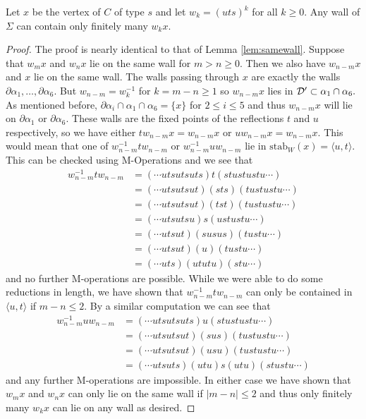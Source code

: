 \documentclass[class=book, crop=false]{standalone}
\begin{document}
\begin{lemma}
	\label{lem:336f2walls}
	Let $x$ be the vertex of $C$ of type $s$ and let $w_k=(uts)^k$ for all $k\ge 0.$ Any wall of $\Sigma$ can contain only finitely many $w_kx.$
\end{lemma}
\begin{proof}
	The proof is nearly identical to that of Lemma \ref{lem:samewall}. Suppose that $w_mx$ and $w_nx$ lie on the same wall for $m>n\ge 0.$ Then we also have $w_{n-m}x$ and $x$ lie on the same wall. The walls passing through $x$ are exactly the walls $\partial\alpha_1,\dots,\partial\alpha_6.$ But $w_{n-m}=w_k^{-1}$ for $k=m-n\ge 1$ so $w_{n-m}x$ lies in $\mathcal{D}'\subset \alpha_1\cap \alpha_6.$ As mentioned before, $\partial\alpha_i\cap \alpha_1\cap \alpha_6=\{x\}$ for $2\le i\le 5$ and thus $w_{n-m}x$ will lie on $\partial\alpha_1$ or $\partial\alpha_6.$ These walls are the fixed points of the reflections $t$ and $u$ respectively, so we have either $tw_{n-m}x=w_{n-m}x$ or $uw_{n-m}x=w_{n-m}x.$ This would mean that one of $w_{n-m}^{-1}tw_{n-m}$ or $w_{n-m}^{-1}uw_{n-m}$ lie in $\mathrm{stab}_W(x)=\langle u,t\rangle.$ This can be checked using M-Operations and we see that
	\begin{align*}
		w_{n-m}^{-1}tw_{n-m}&=(\cdots utsutsuts)t(stustustu\cdots)\\
		&=(\cdots utsutsut)(sts)(tustustu\cdots)\\
		&=(\cdots utsutsut)(tst)(tustustu\cdots)\\
		&=(\cdots utsutsu)s(ustustu\cdots)\\
		&=(\cdots utsut)(susus)(tustu\cdots)\\
		&=(\cdots utsut)(u)(tustu\cdots)\\
		&=(\cdots uts)(ututu)(stu\cdots)
	\end{align*}
	and no further M-operations are possible. While we were able to do some reductions in length, we have shown that $w_{n-m}^{-1}tw_{n-m}$ can only be contained in $\langle u,t\rangle$ if $m-n\le 2.$ By a similar computation we can see that
	\begin{align*}
		w_{n-m}^{-1}uw_{n-m}&=(\cdots utsutsuts)u(stustustu\cdots)\\
		&=(\cdots utsutsut)(sus)(tustustu\cdots)\\
		&=(\cdots utsutsut)(usu)(tustustu\cdots)\\
		&=(\cdots utsuts)(utu)s(utu)(stustu\cdots)
	\end{align*}
	and any further M-operations are impossible. In either case we have shown that $w_mx$ and $w_nx$ can only lie on the same wall if $|m-n|\le 2$ and thus only finitely many $w_k x$ can lie on any wall as desired.
\end{proof}
\end{document}
